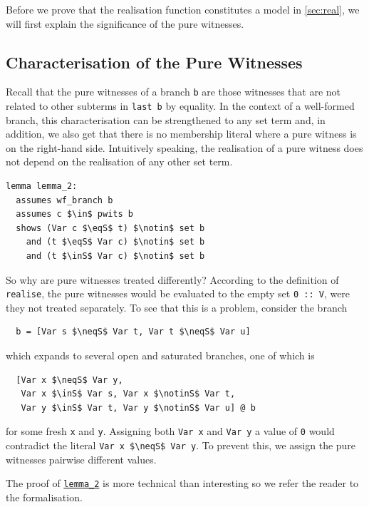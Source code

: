\documentclass[
  sigplan,
  10pt,
  ]{acmart}
\newcommand{\inS}{\in_\text{s}}
\newcommand{\notinS}{\notin_\text{s}}
\newcommand{\eqS}{=_\text{s}}
\newcommand{\neqS}{\neq_\text{s}}
\begin{document}
Before we prove that the realisation function constitutes a model in \autoref{sec:real}, we will first explain the significance of the pure witnesses.

\subsection{Characterisation of the Pure Witnesses\label{sec:pwits}}
Recall that the pure witnesses of a branch \lstinline!b! are those witnesses that are not related to other subterms in \lstinline!last b! by equality.
In the context of a well-formed branch, this characterisation can be strengthened to any set term and, in addition, we also get that there is no membership literal where a pure witness is on the right-hand side.
Intuitively speaking, the realisation of a pure witness does not depend on the realisation of any other set term.
\begin{lstlisting}[label={lst:lemma_2}]
lemma lemma_2:
  assumes wf_branch b
  assumes c $\in$ pwits b
  shows (Var c $\eqS$ t) $\notin$ set b
    and (t $\eqS$ Var c) $\notin$ set b
    and (t $\inS$ Var c) $\notin$ set b
\end{lstlisting}
So why are pure witnesses treated differently?
According to the definition of \lstinline!realise!, the pure witnesses would be evaluated to the empty set \lstinline!0 :: V!, were they not treated separately. 
To see that this is a problem, consider the branch
\begin{lstlisting}
  b = [Var s $\neqS$ Var t, Var t $\neqS$ Var u]
\end{lstlisting}
which expands to several open and saturated branches, one of which is
\begin{lstlisting}
  [Var x $\neqS$ Var y,
   Var x $\inS$ Var s, Var x $\notinS$ Var t,
   Var y $\inS$ Var t, Var y $\notinS$ Var u] @ b
\end{lstlisting}
for some fresh \lstinline!x! and \lstinline!y!.
Assigning both \lstinline!Var x! and \lstinline!Var y! a value of \lstinline!0! would contradict the literal \lstinline!Var x $\neqS$ Var y!.
To prevent this, we assign the pure witnesses pairwise different values.

The proof of \hyperref[lst:lemma_2]{\lstinline!lemma_2!} is more technical than interesting so we refer the reader to the formalisation.
\end{document}
